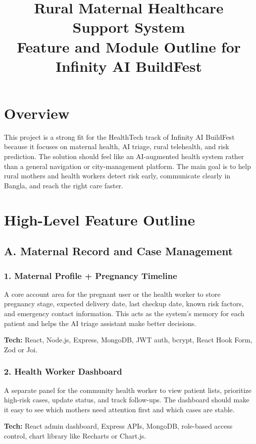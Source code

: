 \documentclass[11pt]{article}
\title{\textbf{Rural Maternal Healthcare Support System}\\
\large Feature and Module Outline for Infinity AI BuildFest}
\author{}
\date{}
\begin{document}
\maketitle

\section{Overview}
This project is a strong fit for the HealthTech track of Infinity AI BuildFest because it focuses on maternal health, AI triage, rural telehealth, and risk prediction. The solution should feel like an AI-augmented health system rather than a general navigation or city-management platform. The main goal is to help rural mothers and health workers detect risk early, communicate clearly in Bangla, and reach the right care faster.

\section{High-Level Feature Outline}

\subsection{A. Maternal Record and Case Management}

\subsubsection{1. Maternal Profile + Pregnancy Timeline}
A core account area for the pregnant user or the health worker to store pregnancy stage, expected delivery date, last checkup date, known risk factors, and emergency contact information. This acts as the system's memory for each patient and helps the AI triage assistant make better decisions.

\textbf{Tech:} React, Node.js, Express, MongoDB, JWT auth, bcrypt, React Hook Form, Zod or Joi.

\subsubsection{2. Health Worker Dashboard}
A separate panel for the community health worker to view patient lists, prioritize high-risk cases, update status, and track follow-ups. The dashboard should make it easy to see which mothers need attention first and which cases are stable.

\textbf{Tech:} React admin dashboard, Express APIs, MongoDB, role-based access control, chart library like Recharts or Chart.js.
\end{document}
